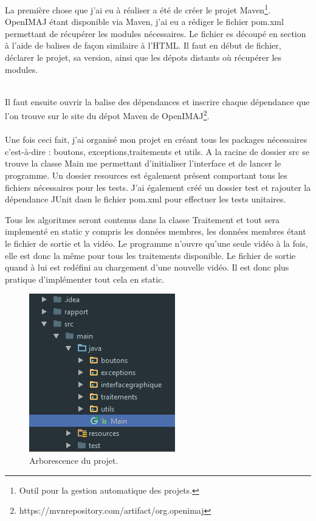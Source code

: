 \documentclass[10pt,a4paper]{article}
\begin{document}
La première chose que j'ai eu à réaliser a été de créer le projet Maven\footnote{Outil pour la gestion automatique des projets.}. OpenIMAJ étant disponible via Maven,
j'ai eu a rédiger le fichier pom.xml permettant de récupérer les modules nécessaires. Le fichier es découpé en section à l'aide de balises de façon similaire à l'HTML. Il faut en début de fichier,
déclarer le projet, sa version, ainsi que les dépots distants où récupérer les modules. \newpage



~~\\
Il faut ensuite ouvrir la balise des dépendances et inscrire chaque dépendance que l'on trouve sur le site du dépot Maven de OpenIMAJ\footnote{https://mvnrepository.com/artifact/org.openimaj}.\\


~~\\

Une fois ceci fait, j'ai organisé mon projet en créant tous les packages nécessaires c'est-à-dire : boutons, exceptions,traitements et utils.
A la racine de dossier src se trouve la classe Main me permettant d'initialiser l'interface et de lancer le programme. Un dossier resources est également présent comportant tous les fichiers
nécessaires pour les tests. J'ai également créé un dossier test et rajouter la dépendance JUnit dasn le fichier pom.xml pour effectuer les tests unitaires.

Tous les algoritmes seront contenus dans la classe Traitement et tout sera implementé en static y compris les données membres, les données membres étant le fichier de sortie et la vidéo.
Le programme n'ouvre qu'une seule vidéo à la fois, elle est donc la même pour tous les traitements disponible. Le fichier de sortie quand à lui est redéfini au chargement d'une nouvelle vidéo.
Il est donc plus pratique d'implémenter tout cela en static.

\begin{figure}[!h]
\center
\includegraphics[scale = 1]{tree.PNG}
\caption{Arborescence du projet.}
\end{figure}
\end{document}
